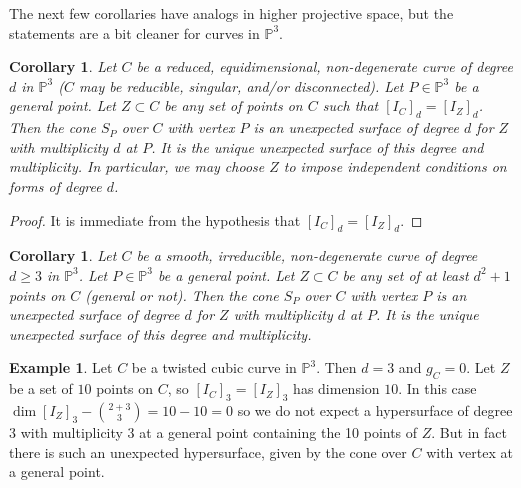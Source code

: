 \documentclass[12pt]{amsart}
\numberwithin{equation}{section}
\newtheorem{corollary}[theorem]{Corollary}
\theoremstyle{definition}
\newtheorem{example}[theorem]{Example}
\newcommand{\PP}{ \ensuremath{\mathbb{P}}}
\begin{document}
The next few corollaries have analogs in higher projective space, but the statements are a bit cleaner for curves in $\PP^3$.


\begin{corollary} \label{curves 1}
Let $C$ be a reduced, equidimensional, non-degenerate curve of degree $d$ in $\PP^3$ ($C$ may be reducible, singular, and/or disconnected). 
Let $P \in \PP^3$ be a general point. Let $Z \subset C$ be any set of  points on $C$ such that $[I_C]_d = [I_Z]_d$. 
Then the cone $S_P$ over $C$ with vertex $P$ is an unexpected surface of degree $d$ for $Z$ with multiplicity $d$ at $P$. It is the 
unique unexpected surface of this degree and multiplicity. In particular, we may choose $Z$ to impose independent conditions on forms of degree $d$.
\end{corollary}

\begin{proof}
It is immediate from the hypothesis that $[I_C]_d = [I_Z]_d$.
\end{proof}

\begin{corollary} \label{curves 2}
Let $C$ be a smooth, irreducible, non-degenerate curve of degree $d \geq 3$ in $\PP^3$. Let $P \in \PP^3$ be a general point. 
Let $Z \subset C$ be any set of at least $d^2+1$ points on $C$ (general or not). Then the cone $S_P$ over $C$ with vertex $P$ is 
an unexpected surface of degree $d$ for $Z$ with multiplicity $d$ at $P$. It is the unique unexpected surface of this degree and multiplicity.
\end{corollary}

\begin{example} \label{twc1}
Let $C$ be a twisted cubic curve in $\PP^3$. Then $d=3$ and $g_C = 0$. Let $Z$ be a set of $10$ points on $C$, so $[I_C]_3 = [I_Z]_3$ 
has dimension $10$. In this case $\dim [I_Z]_3 - \binom{2+3}{3} = 10 - 10 = 0$ so we do not expect a hypersurface of degree 3 with 
multiplicity 3 at a general point containing the 10 points of $Z$. But in fact there is such an unexpected hypersurface, given by the cone over $C$ with vertex at a general point.
\end{example}
\end{document}
